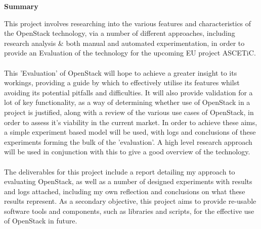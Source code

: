 \begin{center}
    {\LARGE\bf Summary}
\end{center}

This project involves researching into the various features and characteristics of the OpenStack technology, via a number of different approaches, including research analysis \& both manual and automated experimentation, in order to provide an Evaluation of the technology for the upcoming EU project ASCETiC\cite{ascetic}. \\ \\ This 'Evaluation' of OpenStack will hope to achieve a greater insight to its workings, providing a guide by which to effectively utilise its features whilst avoiding its potential pitfalls and difficulties. It will also provide validation for a lot of key functionality, as a way of determining whether use of OpenStack in a project is justified, along with a review of the various use cases of OpenStack, in order to assess it's viability in the current market. In order to achieve these aims, a simple experiment based model will be used, with logs and conclusions of these experiments forming the bulk of the 'evaluation'. A high level research approach will be used in conjunction with this to give a good overview of the technology. \\ \\ 
The deliverables for this project include a report detailing my approach to evaluating OpenStack, as well as a number of designed experiments with results and logs attached, including my own reflection and conclusions on what these results represent. As a secondary objective, this project aims to provide re-usable software tools and components, such as libraries and  scripts, for the effective use of OpenStack in future. 



